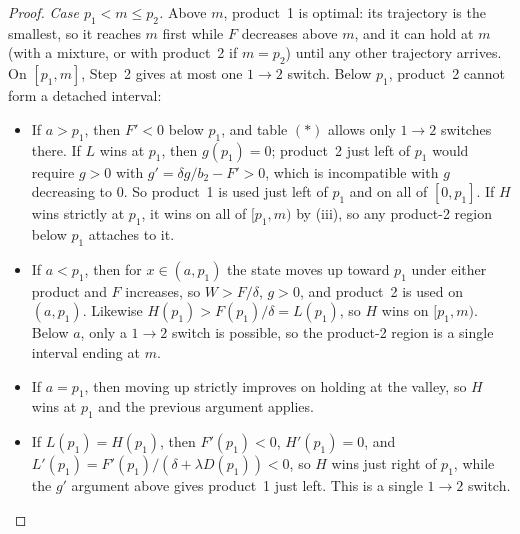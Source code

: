 \documentclass[11pt]{article}
\theoremstyle{definition}
\begin{document}
\begin{proof}
\emph{Case $p_1<m\leq p_2$.} Above $m$, product~1 is optimal: its trajectory
is the smallest, so it reaches $m$ first while $F$ decreases above $m$, and
it can hold at $m$ (with a mixture, or with product~2 if $m=p_2$) until any
other trajectory arrives. On $[p_1,m]$, Step~2 gives at most one $1\to2$
switch. Below $p_1$, product~2 cannot form a detached interval:
\begin{itemize}
\item If $a>p_1$, then $F'<0$ below $p_1$, and table $(*)$ allows only
$1\to2$ switches there. If $L$ wins at $p_1$, then $g(p_1)=0$; product~2
just left of $p_1$ would require $g>0$ with $g'=\delta g/b_2-F'>0$, which is
incompatible with $g$ decreasing to $0$. So product~1 is used just left of
$p_1$ and on all of $[0,p_1]$. If $H$ wins strictly at $p_1$, it wins on all
of $[p_1,m)$ by (iii), so any product-2 region below $p_1$ attaches to it.
\item If $a<p_1$, then for $x\in(a,p_1)$ the state moves up toward $p_1$
under either product and $F$ increases, so $W>F/\delta$, $g>0$, and
product~2 is used on $(a,p_1)$. Likewise $H(p_1)>F(p_1)/\delta=L(p_1)$, so
$H$ wins on $[p_1,m)$. Below $a$, only a $1\to2$ switch is possible, so the
product-2 region is a single interval ending at $m$.
\item If $a=p_1$, then moving up strictly improves on holding at the valley,
so $H$ wins at $p_1$ and the previous argument applies.
\item If $L(p_1)=H(p_1)$, then $F'(p_1)<0$, $H'(p_1)=0$, and
$L'(p_1)=F'(p_1)/(\delta+\lambda D(p_1))<0$, so $H$ wins just right of
$p_1$, while the $g'$ argument above gives product~1 just left. This is a
single $1\to2$ switch.
\end{itemize}


\end{proof}
\end{document}
